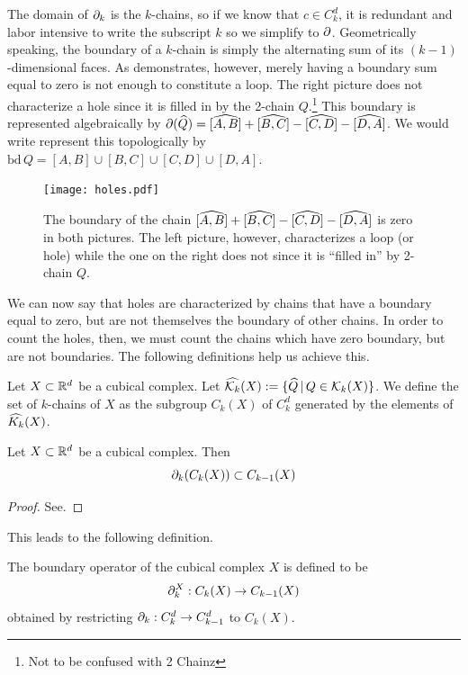 The domain of $\partial_k$ is the $k$-chains, so if we know that $c \in C_k^d$, it is redundant and labor intensive to write the subscript $k$ so we simplify to $\partial$. Geometrically speaking, the boundary of a $k$-chain is simply the alternating sum of its $(k-1)$-dimensional faces. As  demonstrates, however, merely having a boundary sum equal to zero is not enough to constitute a loop. The right picture does not characterize a hole since it is filled in by the 2-chain $Q$.\footnote{Not to be confused with 2 Chainz} This boundary is represented algebraically by $\partial (\widehat{Q}) = [\widehat{A, B}] + [\widehat{B, C}] - [\widehat{C, D}] - [\widehat{D, A}]$. We would write represent this topologically by $\text{bd} \, Q = [A, B] \cup [B, C] \cup [C, D] \cup [D, A]$.

\begin{figure}[h]
\begin{center}
\texttt{[image: holes.pdf]}
\caption{\label{fig:holes} The boundary of the chain $[\widehat{A, B}] + [\widehat{B, C}] - [\widehat{C, D}] - [\widehat{D, A}]$ is zero in both pictures. The left picture, however, characterizes a loop (or hole) while the one on the right does not since it is ``filled in'' by 2-chain $Q$. }
\end{center}
\end{figure}

We can now say that holes are characterized by chains that have a boundary equal to zero, but are not themselves the boundary of other chains. In order to count the holes, then, we must count the chains which have zero boundary, but are not boundaries. The following definitions help us achieve this.

\begin{defn}
	Let $X \subset \mathbb{R}^d$ be a cubical complex. Let $\widehat{\mathcal{K}_k}(X) := \{ \widehat{Q} \, | \, Q \in \mathcal{K}_k(X) \}$. We define the set of $k$-chains of $X$ as the subgroup $C_k(X)$ of $C_k^d$ generated by the elements of $\widehat{K_k}(X)$.
\end{defn}

\begin{prop}
	Let $X \subset \mathbb{R}^d$ be a cubical complex. Then
	$$ \partial_k (C_k(X)) \subset C_{k-1}(X) $$
\end{prop}

\begin{proof}
	See.
\end{proof}

This leads to the following definition.

\begin{defn}
	The boundary operator of the cubical complex $X$ is defined to be
	$$ \partial_k^X : C_k(X) \rightarrow C_{k-1}(X) $$
	obtained by restricting $\partial_k : C_k^d \rightarrow C_{k-1}^d$ to $C_k(X)$.
\end{defn}

